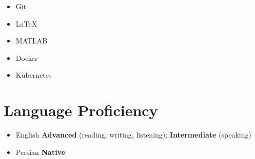 \documentclass[11pt,a4paper,roman]{moderncv} %
\newcommand*{\authorimg}[1]{%
	\raisebox{-.3\baselineskip}{%
		\texttt{[image: \#1]}%
	}%
}
\begin{document}
\begin{adjustwidth}{-0.5in}{0in}
\begin{cvcolumns}
		 {\begin{itemize}
		 		\vspace{0.1em}
		 		\setlength\itemsep{0.3em}
		 		\item \authorimg{pictures/git.png} Git
		 		\item \authorimg{pictures/latex.png} \LaTeX
		 		\item \authorimg{pictures/matlab.jpg} MATLAB
		 		\item \authorimg{pictures/docker.png} Docker
		 		\item \authorimg{pictures/kubernetes.png} Kubernetes
		 \end{itemize}}
	
	\end{cvcolumns}
\end{adjustwidth}

\section{Language Proficiency}

\begin{itemize}
	\item English \hspace{6 pt} \textbf{Advanced} (reading, writing, listening); \textbf{Intermediate} (speaking)
	
	\item Persian \hspace{6 pt} \textbf{Native}
\end{itemize} 
\end{document}
